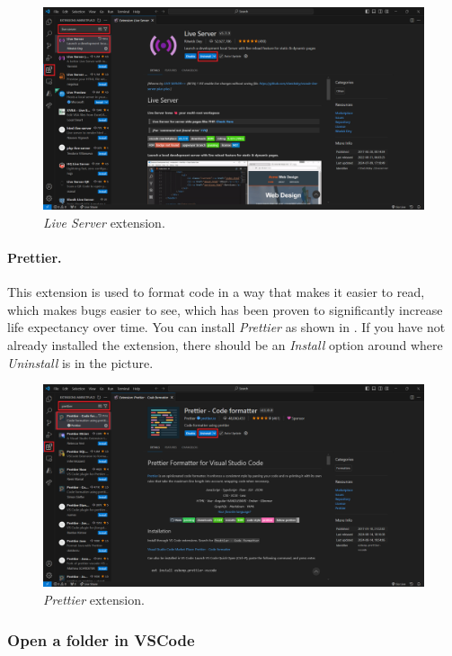 \documentclass[a4paper,10pt]{article}
\begin{document}
\begin{figure}[htbp]
    \centering
    \includegraphics[width=\textwidth]{live_server.png}
    \caption{\emph{Live Server} extension.}
    \label{fig:live_server}   
\end{figure}

\paragraph{Prettier.} This extension is used to format code in a way that makes it easier to read, which makes bugs easier to see, which has been proven to significantly increase life expectancy over time. You can install \emph{Prettier} as shown in . If you have not already installed the extension, there should be an \emph{Install} option around where \emph{Uninstall} is in the picture.

\begin{figure}[htbp]
    \centering
    \includegraphics[width=\textwidth]{prettier.png}
    \caption{\emph{Prettier} extension.}
    \label{fig:prettier}   
\end{figure}

\subsubsection{Open a folder in VSCode}
\end{document}
